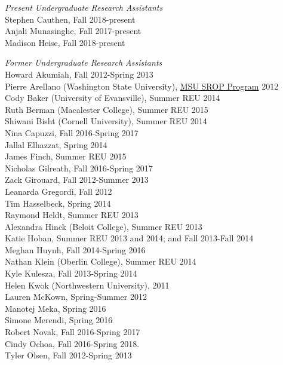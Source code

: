\documentclass[9pt]{extarticle}
\begin{document}
\emph{Present Undergraduate Research Assistants} \\
\vspace{1pt}
Stephen Cauthen, Fall 2018-present \\
Anjali Munasinghe, Fall 2017-present \\
Madison Heise, Fall 2018-present

\emph{Former Undergraduate Research Assistants} \\
\vspace{1pt}
Howard Akumiah, Fall 2012-Spring 2013 \\
Pierre Arellano (Washington State University), \href{http://grad.msu.edu/srop/}{MSU SROP Program} 2012 \\
Cody Baker (University of Evansville), Summer REU 2014 \\
Ruth Berman (Macalester College), Summer REU 2015 \\
Shiwani Bisht (Cornell University), Summer REU 2014 \\
Nina Capuzzi, Fall 2016-Spring 2017 \\
Jallal Elhazzat, Spring 2014 \\
James Finch, Summer REU 2015 \\
Nicholas Gilreath, Fall 2016-Spring 2017 \\
Zack Girouard, Fall 2012-Summer 2013 \\
Leanarda Gregordi, Fall 2012 \\
Tim Hasselbeck, Spring 2014 \\
Raymond Heldt, Summer REU 2013 \\
Alexandra Hinck (Beloit College), Summer REU 2013 \\
Katie Hoban, Summer REU 2013 and 2014; and Fall 2013-Fall 2014 \\
Meghan Huynh, Fall 2014-Spring 2016 \\
Nathan Klein (Oberlin College), Summer REU 2014 \\
Kyle Kulesza, Fall 2013-Spring 2014 \\
Helen Kwok (Northwestern University), 2011 \\
Lauren McKown, Spring-Summer 2012 \\
Manotej Meka, Spring 2016 \\
Simone Merendi, Spring 2016 \\
Robert Novak, Fall 2016-Spring 2017 \\
Cindy Ochoa, Fall 2016-Spring 2018. \\
Tyler Olsen, Fall 2012-Spring 2013 \\
\end{document}
